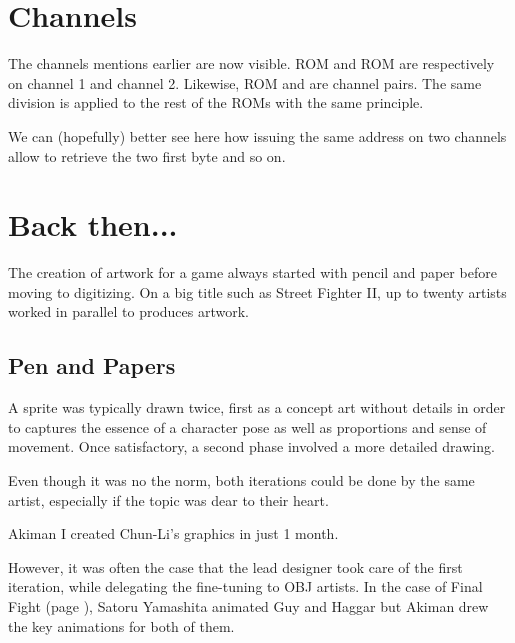 
\section{Channels}\label{channels}
The channels mentions earlier are now visible. ROM  and ROM  are respectively on channel 1 and channel 2. Likewise, ROM  and  are channel pairs. The same division is applied to the rest of the ROMs with the same principle. 

We can (hopefully) better see here how issuing the same address on two channels allow to retrieve the two first byte and so on.












\section{Back then...}
The creation of artwork for a game always started with pencil and paper before moving to digitizing. On a big title such as Street Fighter II, up to twenty artists worked in parallel to produces artwork.

\subsection{Pen and Papers}
A sprite was typically drawn twice, first as a concept art without details in order to captures the essence of a character pose as well as proportions and sense of movement. Once satisfactory, a second phase involved a more detailed drawing.

Even though it was no the norm, both iterations could be done by the same artist, especially if the topic was dear to their heart.

\begin{q}{Akiman}
I created Chun-Li’s graphics in just 1 month.
\end{q}

However, it was often the case that the lead designer took care of the first iteration, while delegating the fine-tuning to OBJ artists. In the case of Final Fight (page \pageref{ff_design}), Satoru Yamashita animated Guy and Haggar but Akiman drew the key animations for both of them.



